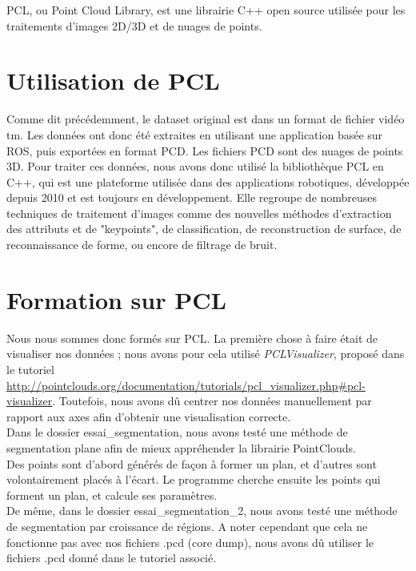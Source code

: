 PCL, ou Point Cloud Library, est une librairie C++ open source utilisée pour les traitements d'images 2D/3D et de nuages de points.\\

\section{Utilisation de PCL}

	Comme dit précédemment, le dataset original est dans un format de fichier vidéo tm. Les données ont donc été extraites en utilisant une application basée sur ROS, puis exportées en format PCD. Les fichiers PCD sont des nuages de points 3D. Pour traiter ces données, nous avons donc utilisé la bibliothèque PCL en C++, qui est une plateforme utilisée dans des applications robotiques, développée depuis 2010 et est toujours en développement. Elle regroupe de nombreuses techniques de traitement d'images comme des nouvelles méthodes d'extraction des attributs et de "keypoints", de classification, de reconstruction de surface, de reconnaissance de forme, ou encore de filtrage de bruit.

\section{Formation sur PCL}

	Nous nous sommes donc formés sur PCL. La première chose à faire était de visualiser nos données ; nous avons pour cela utilisé \emph{PCLVisualizer}, proposé dans le tutoriel \url{http://pointclouds.org/documentation/tutorials/pcl_visualizer.php#pcl-visualizer}. Toutefois, nous avons dû centrer nos données manuellement par rapport aux axes afin d'obtenir une visualisation correcte.\\

	Dans le dossier essai\_segmentation, nous avons testé une méthode de segmentation plane afin de mieux appréhender la librairie PointClouds.\\
	Des points sont d'abord générés de façon à former un plan, et d'autres sont volontairement placés à l'écart. Le programme cherche ensuite les points qui forment un plan, et calcule ses paramètres.\\

	De même, dans le dossier essai\_segmentation\_2, nous avons testé une méthode de segmentation par croissance de régions. A noter cependant que cela ne fonctionne pas avec nos fichiers .pcd (core dump), nous avons dû utiliser le fichiers .pcd donné dans le tutoriel associé.\\

